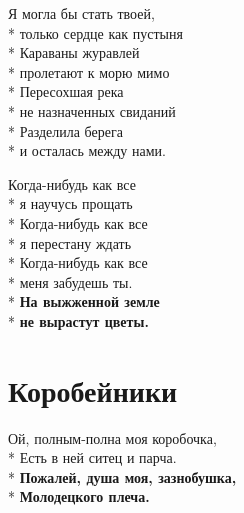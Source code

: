 \medskip

\begin{minipage}{\linewidth}
Я могла бы стать твоей,\\*
только сердце как пустыня\\*
Караваны журавлей\\*
пролетают к морю мимо\\*
Пересохшая река\\*
не назначенных свиданий\\*
Разделила берега\\*
и осталась между нами.\\
\end{minipage}\par\medskip\nobreak

\medskip

\begin{minipage}{\linewidth}
\hspace*{1.5em}Когда-нибудь как все\\*
\hspace*{1.5em}я научусь прощать\\*
\hspace*{1.5em}Когда-нибудь как все\\*
\hspace*{1.5em}я перестану ждать\\*
\hspace*{1.5em}Когда-нибудь как все\\*
\hspace*{1.5em}меня забудешь ты.\\*
\hspace*{1.5em}\textbf{На выжженной земле}\\*
\hspace*{1.5em}\textbf{не вырастут цветы.}\\
\end{minipage}

\vspace{\fill}\newpage

\section{Коробейники}
\label{song:Коробейники}

\medskip

\begin{minipage}{\linewidth}
Ой, полным-полна моя коробочка,\\*
Есть в ней ситец и парча.\\*
\textbf{Пожалей, душа моя, зазнобушка,}\\*
\textbf{Молодецкого плеча.}\\
\end{minipage}\par\medskip\nobreak

